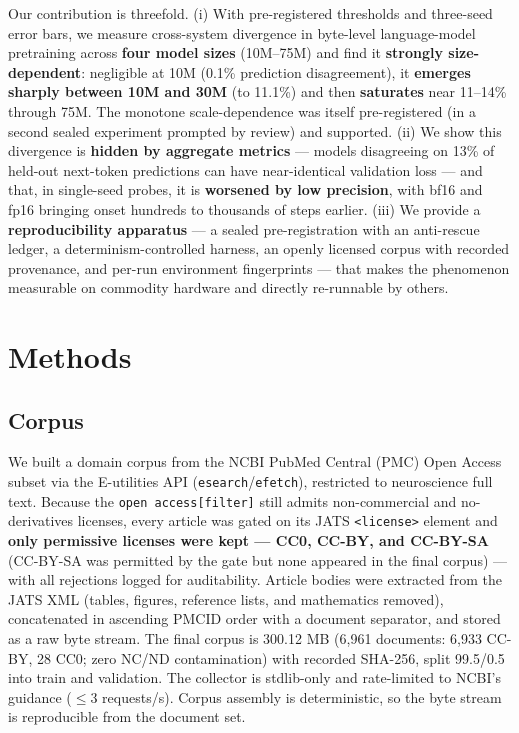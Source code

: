 \documentclass{article}
\newcounter{none}
\begin{document}
Our contribution is threefold. (i) With pre-registered thresholds and three-seed error bars,
we measure cross-system divergence in byte-level language-model pretraining across \textbf{four model
sizes} (10M--75M) and find it \textbf{strongly size-dependent}: negligible at 10M (0.1\% prediction
disagreement), it \textbf{emerges sharply between 10M and 30M} (to 11.1\%) and then \textbf{saturates}
near 11--14\% through 75M. The monotone scale-dependence was itself pre-registered (in a second
sealed experiment prompted by review) and supported. (ii) We show this divergence is \textbf{hidden by aggregate
metrics} --- models disagreeing on 13\% of held-out next-token predictions can have
near-identical validation loss --- and that, in single-seed probes, it is \textbf{worsened by low
precision}, with bf16 and fp16 bringing onset hundreds to thousands of steps earlier.
(iii) We provide a \textbf{reproducibility apparatus} --- a sealed pre-registration with an
anti-rescue ledger, a determinism-controlled harness, an openly licensed corpus with recorded
provenance, and per-run environment fingerprints --- that makes the phenomenon measurable on
commodity hardware and directly re-runnable by others.


\section{Methods}
\subsection{Corpus}\label{corpus}

We built a domain corpus from the NCBI PubMed Central (PMC) Open Access subset via the
E-utilities API (\texttt{esearch}/\texttt{efetch}), restricted to neuroscience full text. Because the
\texttt{open\ access{[}filter{]}} still admits non-commercial and no-derivatives licenses, every article
was gated on its JATS \texttt{\textless{}license\textgreater{}} element and \textbf{only permissive licenses were kept --- CC0,
CC-BY, and CC-BY-SA} (CC-BY-SA was permitted by the gate but none appeared in the final
corpus) --- with all rejections logged for auditability. Article bodies were
extracted from the JATS XML (tables, figures, reference lists, and mathematics removed),
concatenated in ascending PMCID order with a document separator, and stored as a raw
byte stream. The final corpus is 300.12 MB (6,961 documents: 6,933 CC-BY, 28 CC0; zero
NC/ND contamination) with recorded SHA-256, split 99.5/0.5 into train and validation. The
collector is stdlib-only and rate-limited to NCBI's guidance ($\le$3 requests/s). Corpus
assembly is deterministic, so the byte stream is reproducible from the document set.
\end{document}
